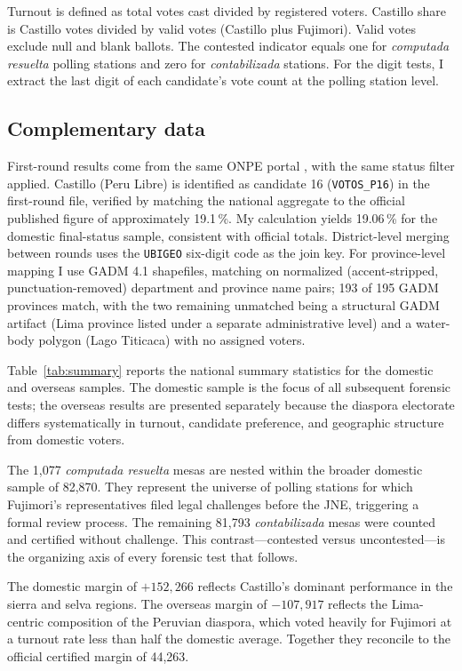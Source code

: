 \documentclass[12pt]{article}
\begin{document}
Turnout is defined as total votes cast divided by registered voters. Castillo
share is Castillo votes divided by valid votes (Castillo plus Fujimori). Valid
votes exclude null and blank ballots. The contested indicator equals one for
\emph{computada resuelta} polling stations and zero for \emph{contabilizada}
stations. For the digit tests, I extract the last digit of each candidate's
vote count at the polling station level.

\subsection{Complementary data}

First-round results come from the same ONPE portal \citep{onpe2021a}, with the
same status filter applied. Castillo (Peru Libre) is identified as candidate
16 (\texttt{VOTOS\_P16}) in the first-round file, verified by matching the
national aggregate to the official published figure of approximately 19.1\,\%.
My calculation yields 19.06\,\% for the domestic final-status sample, consistent
with official totals. District-level merging between rounds uses the
\texttt{UBIGEO} six-digit code as the join key. For province-level mapping I
use GADM 4.1 shapefiles, matching on normalized (accent-stripped, punctuation-removed)
department and province name pairs; 193 of 195 GADM provinces match, with the two
remaining unmatched being a structural GADM artifact (Lima province listed under
a separate administrative level) and a water-body polygon (Lago Titicaca) with
no assigned voters.

Table~\ref{tab:summary} reports the national summary statistics for the
domestic and overseas samples. The domestic sample is the focus of all
subsequent forensic tests; the overseas results are presented separately
because the diaspora electorate differs systematically in turnout, candidate
preference, and geographic structure from domestic voters.

The 1,077 \emph{computada resuelta} mesas are nested within the broader
domestic sample of 82,870. They represent the universe of polling stations
for which Fujimori's representatives filed legal challenges before the JNE,
triggering a formal review process. The remaining 81,793 \emph{contabilizada}
mesas were counted and certified without challenge. This contrast---contested
versus uncontested---is the organizing axis of every forensic test that follows.

The domestic margin of $+152{,}266$ reflects Castillo's dominant performance
in the sierra and selva regions. The overseas margin of $-107{,}917$ reflects
the Lima-centric composition of the Peruvian diaspora, which voted heavily
for Fujimori at a turnout rate less than half the domestic average.
Together they reconcile to the official certified margin of 44,263.
\end{document}
